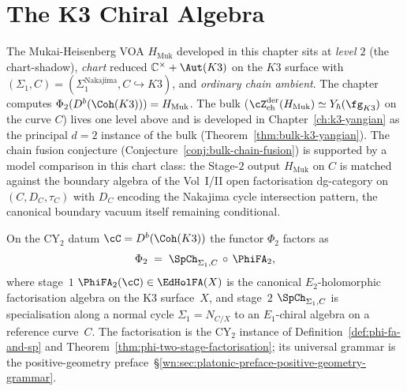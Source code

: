 \label{thm:shadow-dichotomy}%

\chapter{The K3 Chiral Algebra}
\label{ch:k3-chiral-algebra}

\begin{remark}
\label{rem:k3ca-three-axis-coords}
The Mukai-Heisenberg VOA $H_{\mathrm{Muk}}$ developed in this chapter
sits at \emph{level $2$} (the chart-shadow), \emph{chart} reduced
$\mathbb C^{\times} + \Aut(K3)$ on the $K3$ surface with
$(\Sigma_1, C) = (\Sigma_1^{\mathrm{Nakajima}}, C \hookrightarrow K3)$,
and \emph{ordinary chain ambient}. The chapter computes
$\Phi_2(D^b(\Coh(K3))) = H_{\mathrm{Muk}}$. The bulk
($\cZ^{\mathrm{der}}_{\mathrm{ch}}(H_{\mathrm{Muk}}) \simeq
Y_\hbar(\fg_{K3})$ on the curve $C$) lives one level above and is
developed in Chapter~\ref{ch:k3-yangian} as the principal $d = 2$
instance of the bulk
(Theorem~\ref{thm:bulk-k3-yangian}). The chain fusion conjecture
(Conjecture~\ref{conj:bulk-chain-fusion}) is supported by a model
comparison in this chart class: the Stage-$2$ output
$H_{\mathrm{Muk}}$ on $C$ is matched against the boundary algebra of
the Vol~I/II open factorisation dg-category on
$(C, D_C, \tau_C)$ with $D_C$ encoding the Nakajima cycle
intersection pattern, the canonical boundary vacuum itself remaining
conditional.
\end{remark}

\begin{theorem}
\label{thm:k3ca-two-stage-factorisation}
On the CY$_2$ datum $\cC = D^b(\Coh(K3))$ the functor $\Phi_2$ factors as
\[
 \Phi_2 \;=\; \SpCh_{\Sigma_1, C} \,\circ\, \PhiFA_2,
\]
where stage~$1$ $\PhiFA_2(\cC) \in \EdHolFA(X)$ is the canonical $E_2$-holomorphic factorisation algebra on the K3 surface~$X$, and stage~$2$ $\SpCh_{\Sigma_1, C}$ is specialisation along a normal cycle $\Sigma_1 = N_{C/X}$ to an $E_1$-chiral algebra on a reference curve~$C$. The factorisation is the CY$_2$ instance of Definition~\ref{def:phi-fa-and-sp} and Theorem~\ref{thm:phi-two-stage-factorisation}; its universal grammar is the positive-geometry preface~\S\ref{wn:sec:platonic-preface-positive-geometry-grammar}.
\end{theorem}

